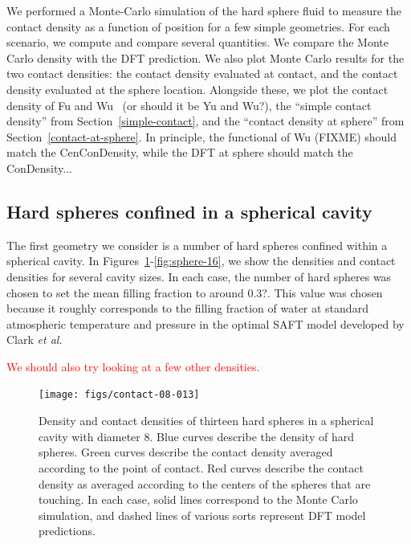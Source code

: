 \documentclass[letterpaper,twocolumn,amsmath,amssymb,prb]{revtex4-1}
\begin{document}
We performed a Monte-Carlo simulation of the hard sphere fluid to
measure the contact density as a function of position for a few simple
geometries.  For each scenario, we compute and compare several
quantities.  We compare the Monte Carlo density with the DFT
prediction.  We also plot Monte Carlo results for the two contact
densities: the contact density evaluated at contact, and the contact
density evaluated at the sphere location.  Alongside these, we plot
the contact density of Fu and Wu~\cite{fu2005vapor-liquid-dft} (or
should it be Yu and Wu\cite{yu2002structures,
  yu2002fmt-dft-inhomogeneous-associating}?), the ``simple contact
density'' from Section~\ref{simple-contact}, and the ``contact density
at sphere'' from Section~\ref{contact-at-sphere}.  In principle, the
functional of Wu (FIXME) should match the CenConDensity, while the DFT
at sphere should match the ConDensity...

\subsection{Hard spheres confined in a spherical cavity}

The first geometry we consider is a number of hard spheres confined
within a spherical cavity.  In
Figures~\ref{fig:sphere-8}-\ref{fig:sphere-16}, we show
the densities and contact densities for several cavity sizes.  In each
case, the number of hard spheres was chosen to set the mean filling
fraction to around 0.3?.  This value was chosen because it roughly
corresponds to the filling fraction of water at standard atmospheric
temperature and pressure in the optimal SAFT model developed by Clark
\emph{et al}\cite{clark2006developing}.

\textcolor{red}{We should also try looking at a few other densities.}

\newcommand\sphereExplanation{ Blue curves describe the density of
  hard spheres.  Green curves describe the contact density averaged
  according to the point of contact.  Red curves describe the contact
  density as averaged according to the centers of the spheres that are
  touching.  In each case, solid lines correspond to the Monte Carlo
  simulation, and dashed lines of various sorts represent DFT model
  predictions.  }

\begin{figure}
  \texttt{[image: figs/contact-08-013]}
  \caption{Density and contact densities of thirteen hard spheres in a
    spherical cavity with diameter 8. \sphereExplanation }
  \label{fig:sphere-8}
\end{figure}
\end{document}
